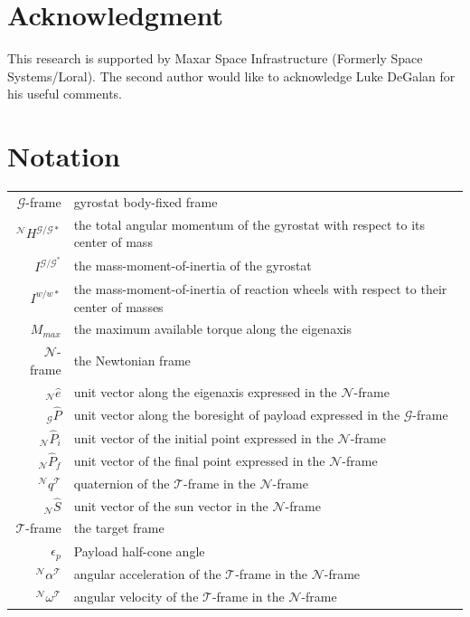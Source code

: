 \documentclass[letterpaper, paper,12pt]{AAS}		%
\begin{document}
	\section{Acknowledgment}
	This research is supported by Maxar Space Infrastructure (Formerly Space Systems/Loral). The second author would like to acknowledge Luke DeGalan for his useful comments.
	\section{Notation}
\begin{tabular}{r l}
$\mathcal{G}$-frame& gyrostat body-fixed frame\\
$^\mathcal{N}H^{\mathcal{G/G*}}$& the total angular momentum of the gyrostat with respect to its center of mass\\
$I^{\mathcal{G/G^*}}$ &the mass-moment-of-inertia of the gyrostat\\
$I^{w/w*}$ & the mass-moment-of-inertia of reaction wheels with respect to their center of masses\\
$M_{max}$ & the maximum available torque along the eigenaxis\\
$\mathcal{N}$-frame & the Newtonian frame \\

$_\mathcal{N}\hat{e}$ & unit vector along the eigenaxis expressed in the $\mathcal{N}$-frame\\
$_\mathcal{G}\hat{P}$ & unit vector along the boresight of payload expressed in the $\mathcal{G}$-frame\\
$_\mathcal{N}\hat{P}_i$ & unit vector of the initial point expressed in the $\mathcal{N}$-frame\\
$_\mathcal{N}\hat{P}_f$ & unit vector of the final point expressed in the $\mathcal{N}$-frame\\

$^\mathcal{N}q^\mathcal{T}$& quaternion of the $\mathcal{T}$-frame in the $\mathcal{N}$-frame\\
$_\mathcal{N}\hat{S}$ & unit vector of the sun vector in the $\mathcal{N}$-frame\\
$\mathcal{T}$-frame & the target frame \\
$\epsilon_p$ & Payload half-cone angle\\
$^\mathcal{N}\alpha^\mathcal{T}$& angular acceleration of the $\mathcal{T}$-frame in the $\mathcal{N}$-frame\\
$^\mathcal{N}\omega^\mathcal{T}$& angular velocity of the $\mathcal{T}$-frame in the $\mathcal{N}$-frame\\

\end{tabular} \\

	
	
	
	
\end{document}
